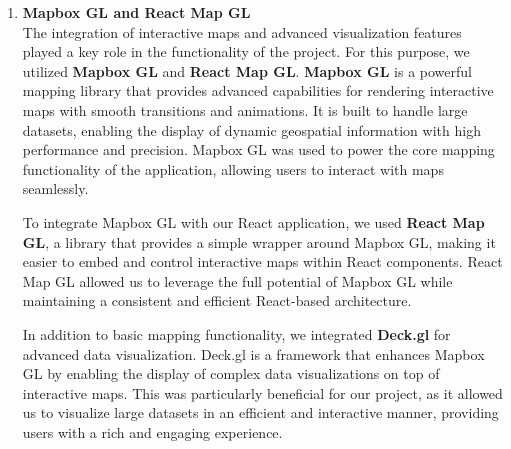 \begin{enumerate}
    \item \textbf{Mapbox GL and React Map GL} \\
    The integration of interactive maps and advanced visualization features played a key role in the functionality of the project. For this purpose, we utilized \textbf{Mapbox GL} and \textbf{React Map GL}. \textbf{Mapbox GL} is a powerful mapping library that provides advanced capabilities for rendering interactive maps with smooth transitions and animations. It is built to handle large datasets, enabling the display of dynamic geospatial information with high performance and precision. Mapbox GL was used to power the core mapping functionality of the application, allowing users to interact with maps seamlessly.

    To integrate Mapbox GL with our React application, we used \textbf{React Map GL}, a library that provides a simple wrapper around Mapbox GL, making it easier to embed and control interactive maps within React components. React Map GL allowed us to leverage the full potential of Mapbox GL while maintaining a consistent and efficient React-based architecture.

    In addition to basic mapping functionality, we integrated \textbf{Deck.gl} for advanced data visualization. Deck.gl is a framework that enhances Mapbox GL by enabling the display of complex data visualizations on top of interactive maps. This was particularly beneficial for our project, as it allowed us to visualize large datasets in an efficient and interactive manner, providing users with a rich and engaging experience.


\end{enumerate}